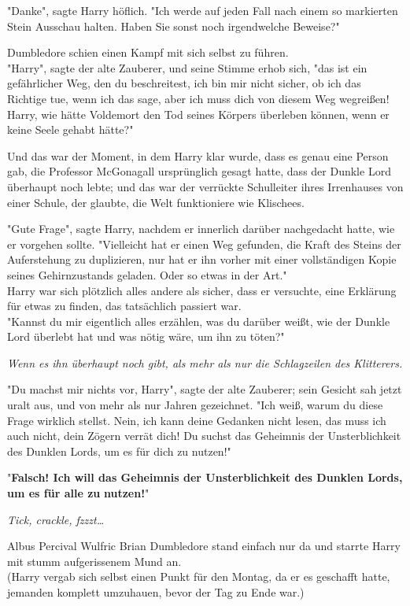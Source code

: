 {"Danke", sagte Harry höflich. "Ich werde auf jeden Fall nach einem so markierten Stein Ausschau halten. Haben Sie sonst noch irgendwelche Beweise?"

Dumbledore schien einen Kampf mit sich selbst zu führen.\\ "Harry", sagte der alte Zauberer, und seine Stimme erhob sich, "das ist ein gefährlicher Weg, den du beschreitest, ich bin mir nicht sicher, ob ich das Richtige tue, wenn ich das sage, aber ich muss dich von diesem Weg wegreißen! Harry, wie hätte Voldemort den Tod seines Körpers überleben können, wenn er keine Seele gehabt hätte?"

Und das war der Moment, in dem Harry klar wurde, dass es genau eine Person gab, die Professor McGonagall ursprünglich gesagt hatte, dass der Dunkle Lord überhaupt noch lebte; und das war der verrückte Schulleiter ihres Irrenhauses von einer Schule, der glaubte, die Welt funktioniere wie Klischees.

"Gute Frage", sagte Harry, nachdem er innerlich darüber nachgedacht hatte, wie er vorgehen sollte. "Vielleicht hat er einen Weg gefunden, die Kraft des Steins der Auferstehung zu duplizieren, nur hat er ihn vorher mit einer vollständigen Kopie seines Gehirnzustands geladen. Oder so etwas in der Art."\\ Harry war sich plötzlich alles andere als sicher, dass er versuchte, eine Erklärung für etwas zu finden, das tatsächlich passiert war.\\ "Kannst du mir eigentlich alles erzählen, was du darüber weißt, wie der Dunkle Lord überlebt hat und was nötig wäre, um ihn zu töten?"

\emph{Wenn es ihn überhaupt noch gibt, als mehr als nur die Schlagzeilen des Klitterers.}

"Du machst mir nichts vor, Harry", sagte der alte Zauberer; sein Gesicht sah jetzt uralt aus, und von mehr als nur Jahren gezeichnet. "Ich weiß, warum du diese Frage wirklich stellst. Nein, ich kann deine Gedanken nicht lesen, das muss ich auch nicht, dein Zögern verrät dich! Du suchst das Geheimnis der Unsterblichkeit des Dunklen Lords, um es für dich zu nutzen!"

"\textbf{Falsch! Ich will das Geheimnis der Unsterblichkeit des Dunklen Lords, um es für alle zu} \textbf{nutzen!}"

\emph{Tick, crackle, fzzzt…}

Albus Percival Wulfric Brian Dumbledore stand einfach nur da und starrte Harry mit stumm aufgerissenem Mund an.\\ (Harry vergab sich selbst einen Punkt für den Montag, da er es geschafft hatte, jemanden komplett umzuhauen, bevor der Tag zu Ende war.)

}
